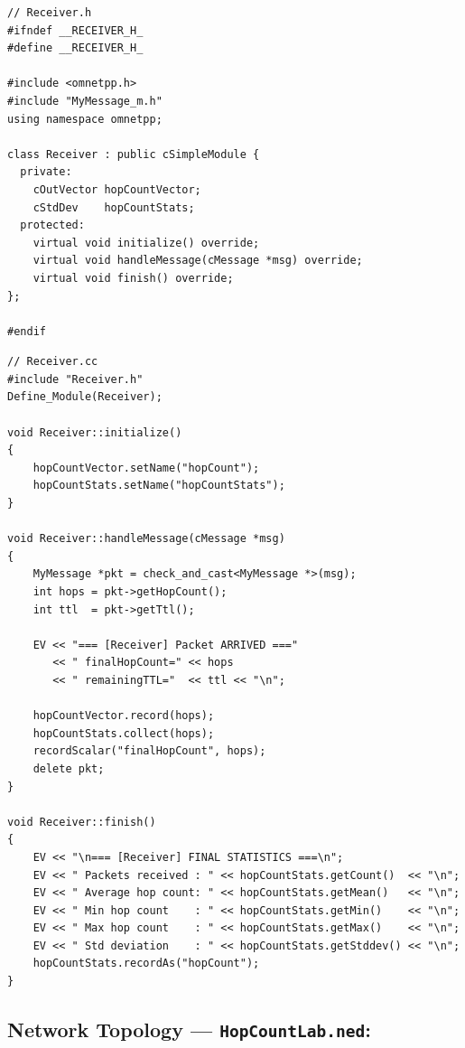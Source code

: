 \documentclass[12pt,a4paper]{article}
\begin{document}
\begin{lstlisting}[style=cppstyle, caption={Receiver.h -- Header file}]
// Receiver.h
#ifndef __RECEIVER_H_
#define __RECEIVER_H_

#include <omnetpp.h>
#include "MyMessage_m.h"
using namespace omnetpp;

class Receiver : public cSimpleModule {
  private:
    cOutVector hopCountVector;
    cStdDev    hopCountStats;
  protected:
    virtual void initialize() override;
    virtual void handleMessage(cMessage *msg) override;
    virtual void finish() override;
};

#endif
\end{lstlisting}

\begin{lstlisting}[style=cppstyle, caption={Receiver.cc -- Implementation}]
// Receiver.cc
#include "Receiver.h"
Define_Module(Receiver);

void Receiver::initialize()
{
    hopCountVector.setName("hopCount");
    hopCountStats.setName("hopCountStats");
}

void Receiver::handleMessage(cMessage *msg)
{
    MyMessage *pkt = check_and_cast<MyMessage *>(msg);
    int hops = pkt->getHopCount();
    int ttl  = pkt->getTtl();

    EV << "=== [Receiver] Packet ARRIVED ==="
       << " finalHopCount=" << hops
       << " remainingTTL="  << ttl << "\n";

    hopCountVector.record(hops);
    hopCountStats.collect(hops);
    recordScalar("finalHopCount", hops);
    delete pkt;
}

void Receiver::finish()
{
    EV << "\n=== [Receiver] FINAL STATISTICS ===\n";
    EV << " Packets received : " << hopCountStats.getCount()  << "\n";
    EV << " Average hop count: " << hopCountStats.getMean()   << "\n";
    EV << " Min hop count    : " << hopCountStats.getMin()    << "\n";
    EV << " Max hop count    : " << hopCountStats.getMax()    << "\n";
    EV << " Std deviation    : " << hopCountStats.getStddev() << "\n";
    hopCountStats.recordAs("hopCount");
}
\end{lstlisting}

\subsection{Network Topology --- \texttt{HopCountLab.ned}: }
\end{document}
